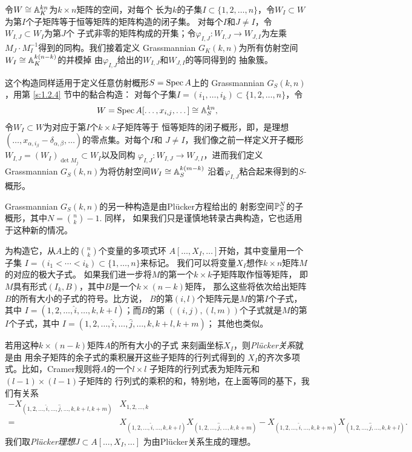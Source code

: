 令$W\cong \A_K^{kn}$为$k\times n$矩阵的空间，对每个
长为$k$的子集$I\subset \{1,2,\dots,n\}$，令$W_I\subset W$
为第$I$个子矩阵等于恒等矩阵的矩阵构造的闭子集。%
对每个$I$和$J\neq I$，令$W_{I,J}\subset W_I$为第$J$个
子式非零的矩阵构成的开集；令$\varphi_{I,J}:W_{I,J}\to
W_{J,I}$为左乘$M_J\cdot M_I^{-1}$得到的同构。我们接着定义
Grassmannian $G_K(k,n)$为所有仿射空间
$W_I\cong \A_K^{k(n-k)}$的并模掉
由$\varphi_{I,J}$给出的$W_{I,J}$和$W_{J,I}$的等同得到的
抽象簇。

这个构造同样适用于定义任意仿射概形$S=\spec A$上的
Grassmannian $G_S(k,n)$，用第 \ref{s:1.2.4} 节中的黏合构造：
对每个子集$I=(i_1,\dots,i_k)\subset \{1,2,\dots,n\}$，令
\[
	W=\spec A[\dots,x_{i,j},\dots]\cong \A_S^{kn},
\]
令$W_I\subset W$为对应于第$I$个$k\times k$子矩阵等于
恒等矩阵的闭子概形，即，是理想$(\dots,x_{\alpha,i_\beta}
-\delta_{\alpha,\beta},\dots)$的零点集。对每个$I$和
$J\neq I$，我们像之前一样定义开子概形
$W_{I,J}=(W_I)_{\det M_j}\subset W_I$以及同构
$\varphi_{I,J}:W_{I,J}\to W_{J,I}$，进而我们定义Grassmannian
$G_S(k,n)$为将仿射空间$W_I\cong \A_S^{k(m-k)}$
沿着$\varphi_{I,J}$粘合起来得到的$S$-概形。

Grassmannian $G_S(k,n)$的另一种构造是由Pl\"{u}cker方程给出的
射影空间$\P_S^N$的子概形，其中$N=\binom{n}{k}-1$. 同样，
如果我们只是谨慎地转录古典构造，它也适用于这种新的情况。

为构造它，从$A$上的$\binom{n}{k}$个变量的多项式环
$A[\dots,X_I,\dots]$开始，其中变量用一个子集
$I=(i_1<\cdots<i_k)\subset \{1,\dots,n\}$来标记。
我们可以将变量$X_I$想作$k\times n$矩阵$M$的对应的极大子式。
如果我们进一步将$M$的第一个$k\times k$子矩阵取作恒等矩阵，
即$M$具有形式$(I_k,B)$，其中$B$是一个$k\times (n-k)$矩阵，
那么这些将依次给出矩阵$B$的所有大小的子式的符号。比方说，
$B$的第$(i,l)$个矩阵元是$M$的第$I$个子式，其中
$I=(1,2,\dots,\hat i,\dots, k,k+l)$；而$B$的第
$((i,j),(l,m))$个子式就是$M$的第$I$个子式，其中
$I=(1,2,\dots,\hat i,\dots,\hat j,\dots,k,k+l,k+m)$；
其他也类似。

若用这种$k\times (n-k)$矩阵$A$的所有大小的子式
来刻画坐标$X_I$，则\textit{Pl\"{u}cker关系}就是由
用余子矩阵的余子式的乘积展开这些子矩阵的行列式得到的
$X_I$的齐次多项式。比如，Cramer规则将$A$的一个$l\times l$
子矩阵的行列式表为矩阵元和$(l-1)\times (l-1)$子矩阵的
行列式的乘积的和，特别地，在上面等同的基下，我们有关系
\begin{align*}
	-X_{(1,2,\dots,\hat{i},\dots,\hat{j},\dots,k,k+l,k+m)}
	& X_{1,2,\dots,k}\\
	= & X_{(1,2,\dots,\hat i,\dots,k,k+l)}
	X_{(1,2,\dots,\hat j,\dots,k,k+m)}-
	X_{(1,2,\dots,\hat i,\dots,k,k+m)}
	X_{(1,2,\dots,\hat j,\dots,k,k+l)}.
\end{align*}
我们取\textit{Pl\"{u}cker理想}$J\subset A[\dots,X_I,\dots]$
为由Pl\"{u}cker关系生成的理想。

